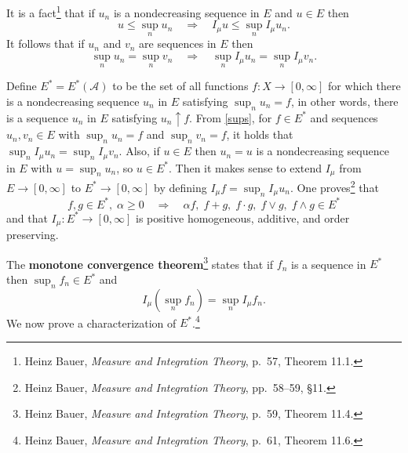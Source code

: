\documentclass{article}
\theoremstyle{definition}
\begin{document}
It is a fact\footnote{Heinz Bauer,
{\em Measure and Integration Theory}, p.~57, Theorem 11.1.} that if $u_n$ is a  nondecreasing sequence in $E$ and $u \in E$ then
\[
u \leq \sup_n u_n \quad \Rightarrow  \quad I_\mu u \leq \sup_n I_\mu u_n.
\]
It follows that if $u_n$ and $v_n$ are sequences 
in $E$ then
\begin{equation}
\sup_n u_n = \sup_n v_n \quad \Rightarrow \quad
\sup_n I_\mu u_n = \sup_n I_\mu v_n.
\label{sups}
\end{equation}

Define $E^*=E^*(\mathscr{A})$ to be the set of all functions $f:X \to [0,\infty]$ for which there is 
a nondecreasing sequence $u_n$ in $E$ satisfying $\sup_n u_n = f$, in other words, there is a sequence
$u_n$ in $E$ satisfying $u_n \uparrow f$. 
From \eqref{sups}, for $f \in E^*$ and sequences $u_n,v_n \in E$ with $\sup_n u_n = f$ and
$\sup_n v_n=f$, it holds that $\sup_n I_\mu u_n = \sup_n I_\mu v_n$. Also,
if $u \in E$ then $u_n=u$ is a nondecreasing sequence in $E$ with
$u=\sup_n u_n$, so $u \in E^*$.
Then it makes sense to extend $I_\mu$ from $E \to [0,\infty]$ to $E^* \to [0,\infty]$ by defining
$I_\mu f = \sup_n I_\mu u_n$. 
One proves\footnote{Heinz Bauer,
{\em Measure and Integration Theory}, pp.~58--59, \S 11.} that
\[
f,g \in E^*,\; \alpha \geq 0 \quad \Rightarrow\quad \alpha f, \; f+g,\; f\cdot g,\; f \vee g, \; f\wedge g \in E^*
\]
and that $I_\mu:E^* \to [0,\infty]$ is positive homogeneous, additive, and order preserving. 





The \textbf{monotone convergence theorem}\footnote{Heinz Bauer,
{\em Measure and Integration Theory}, p.~59, Theorem 11.4.}
states that if $f_n$ is a sequence in $E^*$ then $\sup_n f_n \in E^*$ and
\[
I_\mu \left( \sup_n f_n \right) = \sup_n I_\mu f_n.
\]
We now prove a characterization of $E^*$.\footnote{Heinz Bauer,
{\em Measure and Integration Theory}, p.~61, Theorem 11.6.}
\end{document}
